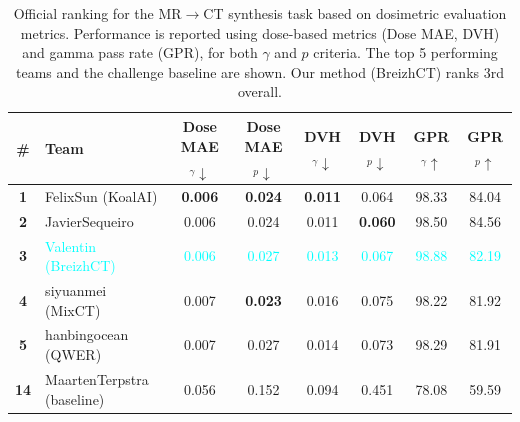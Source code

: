 \begin{table}[h!]
\centering
\scriptsize
\renewcommand{\arraystretch}{1}
\setlength{\tabcolsep}{4pt}
\caption{
Official ranking for the MR$\rightarrow$CT synthesis task based on dosimetric evaluation metrics. Performance is reported using dose-based metrics (Dose MAE, DVH) and gamma pass rate (GPR), for both $\gamma$ and $p$ criteria. The top 5 performing teams and the challenge baseline are shown. Our method (BreizhCT) ranks 3rd overall.
}
\label{tab:mrct_dose}
\begin{tabular}{clcccccc}
\toprule
\textbf{\#} & \textbf{Team} 
& \textbf{Dose MAE$_\gamma\downarrow$} 
& \textbf{Dose MAE$_p\downarrow$} 
& \textbf{DVH$_\gamma\downarrow$} 
& \textbf{DVH$_p\downarrow$} 
& \textbf{GPR$_\gamma\uparrow$} 
& \textbf{GPR$_p\uparrow$} \\
\midrule
\textbf{1} & FelixSun (KoalAI) 
& \textbf{0.006} & \textbf{0.024} & \textbf{0.011} & 0.064 & 98.33 & 84.04 \\
\textbf{2} & JavierSequeiro 
& 0.006 & 0.024 & 0.011 & \textbf{0.060} & 98.50 & 84.56 \\
\textbf{3} & \textcolor{cyan}{Valentin (BreizhCT)} 
& \textcolor{cyan}{0.006} & \textcolor{cyan}{0.027} & \textcolor{cyan}{0.013} & \textcolor{cyan}{0.067} & \textcolor{cyan}{98.88} & \textcolor{cyan}{82.19} \\
\textbf{4} & siyuanmei (MixCT) 
& 0.007 & \textbf{0.023} & 0.016 & 0.075 & 98.22 & 81.92 \\
\textbf{5} & hanbingocean (QWER) 
& 0.007 & 0.027 & 0.014 & 0.073 & 98.29 & 81.91 \\
\midrule
\textbf{14} & MaartenTerpstra (baseline) 
& 0.056 & 0.152 & 0.094 & 0.451 & 78.08 & 59.59 \\
\bottomrule
\end{tabular}

\end{table}
